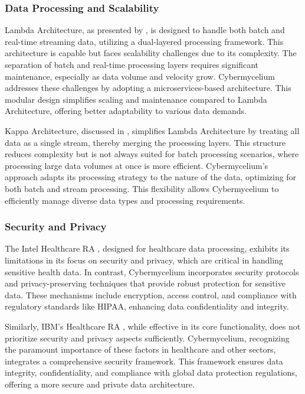 \documentclass[review]{elsarticle}
\begin{document}
\subsubsection{Data Processing and Scalability}

Lambda Architecture, as presented by \cite{kiran2015lambda}, is designed to handle both batch and real-time streaming data, utilizing a dual-layered processing framework. This architecture is capable but faces scalability challenges due to its complexity. The separation of batch and real-time processing layers requires significant maintenance, especially as data volume and velocity grow. Cybermycelium addresses these challenges by adopting a microservices-based architecture. This modular design simplifies scaling and maintenance compared to Lambda Architecture, offering better adaptability to various data demands.

Kappa Architecture, discussed in \cite{kreps2014questioning}, simplifies Lambda Architecture by treating all data as a single stream, thereby merging the processing layers. This structure reduces complexity but is not always suited for batch processing scenarios, where processing large data volumes at once is more efficient. Cybermycelium's approach adapts its processing strategy to the nature of the data, optimizing for both batch and stream processing. This flexibility allows Cybermycelium to efficiently manage diverse data types and processing requirements.



\subsubsection{Security and Privacy}
The Intel Healthcare RA \cite{SikoraWohlfeld2014}, designed for healthcare data processing, exhibits its limitations in its focus on security and privacy, which are critical in handling sensitive health data. In contrast, Cybermycelium incorporates security protocols and privacy-preserving techniques that provide robust protection for sensitive data. These mechanisms include encryption, access control, and compliance with regulatory standards like HIPAA, enhancing data confidentiality and integrity.

Similarly, IBM's Healthcare RA \cite{quintero2019ibm}, while effective in its core functionality, does not prioritize security and privacy aspects sufficiently. Cybermycelium, recognizing the paramount importance of these factors in healthcare and other sectors, integrates a comprehensive security framework. This framework ensures data integrity, confidentiality, and compliance with global data protection regulations, offering a more secure and private data architecture.
\end{document}
